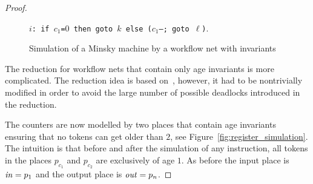 \begin{proof}
\begin{figure}[!h]
\begin{center}
\begin{minipage}[c]{\textwidth}
   \captionsetup{type=subfigure}
   \caption{{\tt $i$: if $c_1$=$0$ then goto $k$ else 
           ($c_1$--; goto $\ell$)}.}
    \label{fig:test_decrement_simulation}
  \end{minipage}
  \caption{Simulation of a Minsky machine by a workflow net with invariants}%
  \label{fig:cont}%
\end{center}
\end{figure}


The reduction for workflow nets that contain only age invariants
is more complicated. The reduction idea is based on~\cite{memics_paper}, 
however, it had to be nontrivially modified in order to avoid the
large number of possible deadlocks introduced in the reduction.

The counters are now modelled by two places that contain age invariants
ensuring that no tokens can get older than $2$, see 
Figure~\ref{fig:register_simulation}. The intuition is that
before and after the simulation of any instruction, all tokens in
the places $p_{c_1}$ and $p_{c_2}$ are exclusively of age $1$. 
As before the input place is ${\mathit{in}}=p_1$ and the output place
is ${\mathit{out}}=p_n$.


\end{proof}
